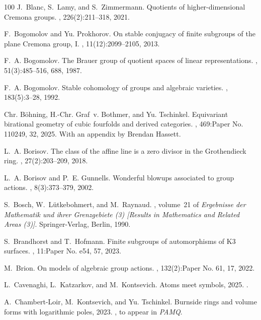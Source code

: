 \documentclass[12pt,reqno]{amsart}
\theoremstyle{plain}
\theoremstyle{remark}
\theoremstyle{definition}
\numberwithin{equation}{section}
\begin{document}
\begin{thebibliography}{100}
J.~Blanc, S.~Lamy, and S.~Zimmermann.
\newblock Quotients of higher-dimensional {C}remona groups.
, 226(2):211--318, 2021.

F.~Bogomolov and Yu. Prokhorov.
\newblock On stable conjugacy of finite subgroups of the plane {C}remona group,
  {I}.
, 11(12):2099--2105, 2013.

F.~A. Bogomolov.
\newblock The {B}rauer group of quotient spaces of linear representations.
, 51(3):485--516, 688, 1987.

F.~A. Bogomolov.
\newblock Stable cohomology of groups and algebraic varieties.
, 183(5):3--28, 1992.

Chr. B\"ohning, H.-Chr. Graf~v. Bothmer, and Yu. Tschinkel.
\newblock Equivariant birational geometry of cubic fourfolds and derived
  categories.
, 469:Paper No. 110249, 32, 2025.
\newblock With an appendix by Brendan Hassett.

L.~A. Borisov.
\newblock The class of the affine line is a zero divisor in the {G}rothendieck
  ring.
, 27(2):203--209, 2018.

L.~A. Borisov and P.~E. Gunnells.
\newblock Wonderful blowups associated to group actions.
, 8(3):373--379, 2002.

S.~Bosch, W.~L\"utkebohmert, and M.~Raynaud.
, volume~21 of {\em Ergebnisse der Mathematik und
  ihrer Grenzgebiete (3) [Results in Mathematics and Related Areas (3)]}.
\newblock Springer-Verlag, Berlin, 1990.

S.~Brandhorst and T.~Hofmann.
\newblock Finite subgroups of automorphisms of {K}3 surfaces.
, 11:Paper No. e54, 57, 2023.

M.~Brion.
\newblock On models of algebraic group actions.
, 132(2):Paper No. 61, 17,
  2022.

L.~Cavenaghi, L.~Katzarkov, and M.~Kontsevich.
\newblock Atoms meet symbols, 2025.
.

A.~Chambert-Loir, M.~Kontsevich, and Yu. Tschinkel.
\newblock Burnside rings and volume forms with logarithmic poles, 2023.
, to appear in {\em PAMQ}.


\end{thebibliography}
\end{document}
